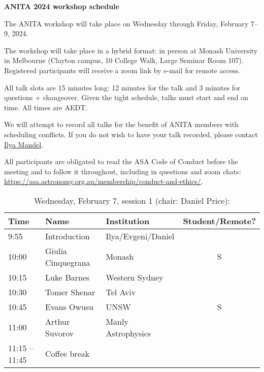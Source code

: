 \documentclass[amsmath,onecolumn]{revtex4-1}
\begin{document}
\begin{center}
{\bf ANITA 2024 workshop schedule}\\
\end{center}
\vspace{0.2in}

The ANITA workshop will take place on Wednesday through Friday, February 7--9, 2024.

The workshop will take place in a hybrid format: in person at Monash University in Melbourne (Clayton campus, 10 College Walk, Large Seminar Room 107).  Registered participants will receive a zoom link by e-mail for remote access.  


All talk slots are 15 minutes long: 12 minutes for the talk and 3 minutes for questions + changeover.  Given the tight schedule, talks must start and end on time.  All times are AEDT.


We will attempt to record all talks for the benefit of ANITA members with scheduling conflicts.  If you do not wish to have your talk recorded, please contact \href{mailto:ilya.mandel@monash.edu}{Ilya Mandel}.

All participants are obligated to read the ASA Code of Conduct before the meeting and to follow it throughout, including in questions and zoom chats:
\url{https://asa.astronomy.org.au/membership/conduct-and-ethics/}.


\FloatBarrier

\begin{table}[!htbp]
	\centering
	\caption{Wednesday, February 7, session 1 (chair: Daniel Price):}
\begin{tabular}{| l | l | l | c |}
	\hline
	Time & Name  & Institution & Student/Remote? \\ 		
	\hline
	9:55 & Introduction & Ilya/Evgeni/Daniel & \\
	\hline
	10:00 & Giulia	Cinquegrana & Monash & S\\
	10:15 & 	Luke	Barnes & Western Sydney & \\
	10:30 & Tomer Shenar &  Tel Aviv&  \\
	10:45 & Evans	Owusu & UNSW & S \\
	11:00 & Arthur	Suvorov & Manly Astrophysics & \\
	\hline
	11:15 -- 11:45 & Coffee break & & \\
	\hline
\end{tabular}
\end{table}
\end{document}
